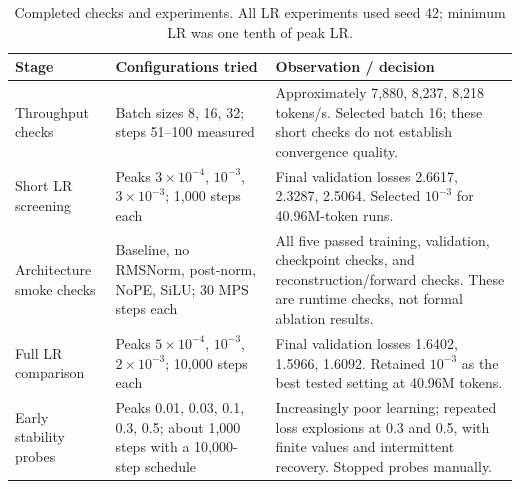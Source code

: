 \begin{table}[htbp]
    \centering
    \small
    \begin{tabular}{@{}>{\raggedright\arraybackslash}p{}
        >{\raggedright\arraybackslash}p{}
        >{\raggedright\arraybackslash}p{}@{}}
        \toprule
        Stage & Configurations tried & Observation / decision \\
        \midrule
        Throughput checks & Batch sizes 8, 16, 32; steps 51--100 measured
        & Approximately 7,880, 8,237, 8,218 tokens/s. Selected batch 16;
          these short checks do not establish convergence quality. \\
        \addlinespace
        Short LR screening & Peaks $3\times10^{-4}$, $10^{-3}$,
          $3\times10^{-3}$; 1,000 steps each
        & Final validation losses 2.6617, 2.3287, 2.5064.
          Selected $10^{-3}$ for 40.96M-token runs. \\
        \addlinespace
        Architecture smoke checks & Baseline, no RMSNorm, post-norm,
          NoPE, SiLU; 30 MPS steps each
        & All five passed training, validation, checkpoint checks,
          and reconstruction/forward checks. These are runtime checks,
          not formal ablation results. \\
        \addlinespace
        Full LR comparison & Peaks $5\times10^{-4}$, $10^{-3}$,
          $2\times10^{-3}$; 10,000 steps each
        & Final validation losses 1.6402, 1.5966, 1.6092.
          Retained $10^{-3}$ as the best tested setting at 40.96M tokens. \\
        \addlinespace
        Early stability probes & Peaks 0.01, 0.03, 0.1, 0.3, 0.5;
          about 1,000 steps with a 10,000-step schedule
        & Increasingly poor learning; repeated loss explosions at
          0.3 and 0.5, with finite values and intermittent recovery.
          Stopped probes manually. \\
        \bottomrule
    \end{tabular}
    \caption{Completed checks and experiments. All LR experiments used seed 42;
    minimum LR was one tenth of peak LR.}
    \label{tab:experiment_log}
\end{table}
